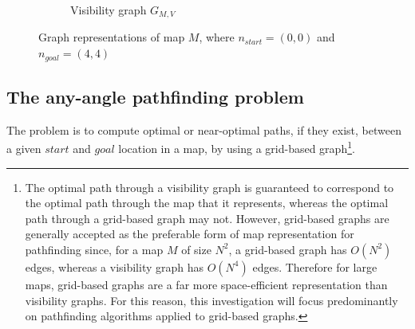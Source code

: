 \documentclass[12pt,notitlepage]{report}
\begin{document}
\begin{figure}[h]
\begin{subfigure}{.5\textwidth}
    \caption{Visibility graph $G_{M,V}$}
  \end{subfigure}
  \caption[Graph representations of map $M$]{Graph representations of map $M$, where $n_{start} = (0,0)$ and $n_{goal} = (4,4)$}
\end{figure}

\subsection{The any-angle pathfinding problem}

The problem is to compute optimal or near-optimal paths, if they exist, between a given $start$ and $goal$ location in a map, by using a grid-based graph\footnote{The optimal path through a visibility graph is guaranteed to correspond to the optimal path through the map that it represents, whereas the optimal path through a grid-based graph may not\cite{Nash11}. However, grid-based graphs are generally accepted as the preferable form of map representation for pathfinding since, for a map $M$ of size $N^{2}$, a grid-based graph has {$O(N^{2})$} edges, whereas a visibility graph has {$O(N^{4})$} edges. Therefore for large maps, grid-based graphs are a far more space-efficient representation than visibility graphs. For this reason, this investigation will focus predominantly on pathfinding algorithms applied to grid-based graphs.}.\\
\end{document}

